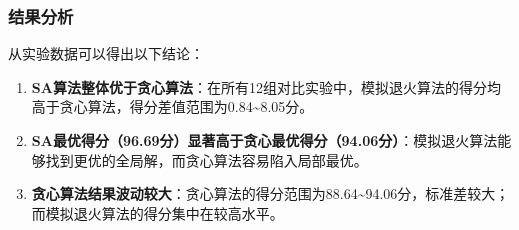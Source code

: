 \documentclass[UTF8,12pt,a4paper]{ctexart}
\begin{document}
\subsubsection{结果分析}

从实验数据可以得出以下结论：

\begin{enumerate}
	\item \textbf{SA算法整体优于贪心算法}：在所有12组对比实验中，模拟退火算法的得分均高于贪心算法，得分差值范围为0.84\textasciitilde8.05分。
	
	\item \textbf{SA最优得分（96.69分）显著高于贪心最优得分（94.06分）}：模拟退火算法能够找到更优的全局解，而贪心算法容易陷入局部最优。
	
	\item \textbf{贪心算法结果波动较大}：贪心算法的得分范围为88.64\textasciitilde94.06分，标准差较大；而模拟退火算法的得分集中在较高水平。
\end{enumerate}
\end{document}
